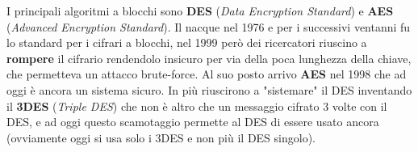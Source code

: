 \documentclass{report}
\begin{document}
I principali algoritmi a blocchi sono \textbf{DES} (\textit{Data Encryption Standard}) e \textbf{AES} (\textit{Advanced Encryption Standard}). Il nacque nel 1976 e per i successivi ventanni fu lo standard per i cifrari a blocchi, nel 1999 però dei ricercatori riuscino a \textbf{rompere} il cifrario rendendolo insicuro per via della poca lunghezza della chiave, che permetteva un attacco brute-force. Al suo posto arrivo \textbf{AES} nel 1998 che ad oggi è ancora un sistema sicuro. In più riuscirono a "sistemare" il DES inventando il \textbf{3DES} (\textit{Triple DES}) che non è altro che un messaggio cifrato 3 volte con il DES, e ad oggi questo scamotaggio permette al DES di essere usato ancora (ovviamente oggi si usa solo i 3DES e non più il DES singolo).
\end{document}
